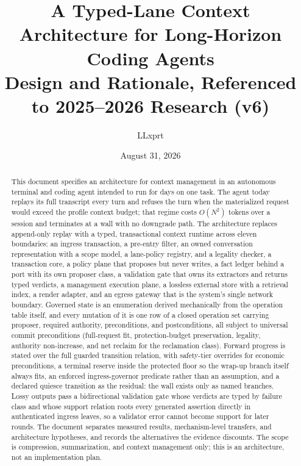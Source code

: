 \documentclass[11pt]{article}
\title{A Typed-Lane Context Architecture for Long-Horizon Coding Agents\\ \large Design and Rationale, Referenced to 2025--2026 Research (v6)}
\author{LLxprt}
\date{August 31, 2026}
\begin{document}
\maketitle

\begin{abstract}
This document specifies an architecture for context management in an autonomous terminal and coding agent intended to run for days on one task. The agent today replays its full transcript every turn and refuses the turn when the materialized request would exceed the profile context budget; that regime costs $O(N^2)$ tokens over a session and terminates at a wall with no downgrade path. The architecture replaces append-only replay with a typed, transactional context runtime across eleven boundaries: an ingress transaction, a pre-entry filter, an owned conversation representation with a scope model, a lane-policy registry, and a legality checker, a transaction core, a policy plane that proposes but never writes, a fact ledger behind a port with its own proposer class, a validation gate that owns its extractors and returns typed verdicts, a management execution plane, a lossless external store with a retrieval index, a render adapter, and an egress gateway that is the system's single network boundary. Governed state is an enumeration derived mechanically from the operation table itself, and every mutation of it is one row of a closed operation set carrying proposer, required authority, preconditions, and postconditions, all subject to universal commit preconditions (full-request fit, protection-budget preservation, legality, authority non-increase, and net reclaim for the reclamation class). Forward progress is stated over the full guarded transition relation, with safety-tier overrides for economic preconditions, a terminal reserve inside the protected floor so the wrap-up branch itself always fits, an enforced ingress-governor predicate rather than an assumption, and a declared quiesce transition as the residual: the wall exists only as named branches. Lossy outputs pass a bidirectional validation gate whose verdicts are typed by failure class and whose support relation roots every generated assertion directly in authenticated ingress leaves, so a validator error cannot become support for later rounds. The document separates measured results, mechanism-level transfers, and architecture hypotheses, and records the alternatives the evidence discounts. The scope is compression, summarization, and context management only; this is an architecture, not an implementation plan.
\end{abstract}
\end{document}
